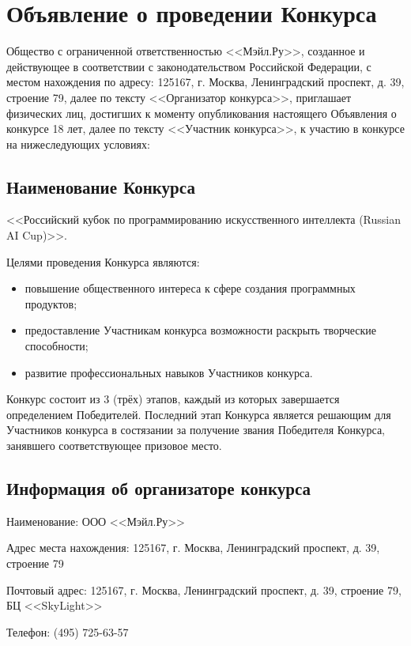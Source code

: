 \setlength{\parskip}{0.125in}

\chapter{Объявление о проведении Конкурса}

Общество с ограниченной ответственностью <<Мэйл.Ру>>, созданное и действующее в соответствии с законодательством Российской Федерации, с
местом нахождения по адресу: 125167, г. Москва, Ленинградский проспект, д. 39, строение 79, далее по тексту <<Организатор конкурса>>,
приглашает физических лиц, достигших к моменту опубликования настоящего Объявления о конкурсе 18 лет, далее по тексту <<Участник конкурса>>,
к участию в конкурсе на нижеследующих условиях:

\section{Наименование Конкурса}

<<Российский кубок по программированию искусственного интеллекта (Russian AI Cup)>>.

Целями проведения Конкурса являются:
\begin{itemize}
\item повышение общественного интереса к сфере создания программных продуктов;
\item предоставление Участникам конкурса возможности раскрыть творческие способности;
\item развитие профессиональных навыков Участников конкурса.
\end{itemize}

Конкурс состоит из 3 (трёх) этапов, каждый из которых завершается определением Победителей. Последний этап Конкурса является решающим для
Участников конкурса в состязании за получение звания Победителя Конкурса, занявшего соответствующее призовое место.

\section{Информация об организаторе конкурса}

Наименование: ООО <<Мэйл.Ру>>

Адрес места нахождения: 125167, г. Москва, Ленинградский проспект, д. 39, строение 79

Почтовый адрес: 125167, г. Москва, Ленинградский проспект, д. 39, строение 79, БЦ <<SkyLight>>

Телефон: (495) 725-63-57

